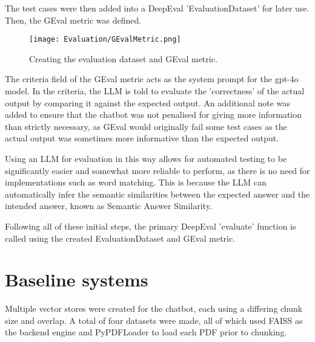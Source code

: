 \para The test cases were then added into a DeepEval 'EvaluationDataset' for later use. Then, the GEval metric was defined.

\begin{figure}[H]
    \centering
    \texttt{[image: Evaluation/GEvalMetric.png]}
    \caption{Creating the evaluation dataset and GEval metric. \label{fig:GEvalAndDataset}}
\end{figure}

\noindent The criteria field of the GEval metric acts as the system prompt for the gpt-4o model. In the criteria, the LLM is told 
to evaluate the 'correctness' of the actual output by comparing it against the expected output. An additional note was added to ensure 
that the chatbot was not penalised for giving more information than strictly necessary, as GEval would originally fail some test cases 
as the actual output was sometimes more informative than the expected output.

\para Using an LLM for evaluation in this way allows for automated testing to be significantly easier and somewhat more reliable to 
perform, as there is no need for implementations such as word matching. This is because the LLM can automatically infer the semantic 
similarities between the expected answer and the intended answer, known as Semantic Answer Similarity. 

\para Following all of these initial steps, the primary DeepEval 'evaluate' function is called using the created EvaluationDataset
and GEval metric. 

\section{Baseline systems}
Multiple vector stores were created for the chatbot, each using a differing chunk size and overlap. A total of four datasets were 
made, all of which used FAISS as the backend engine and PyPDFLoader to load each PDF prior to chunking. 

